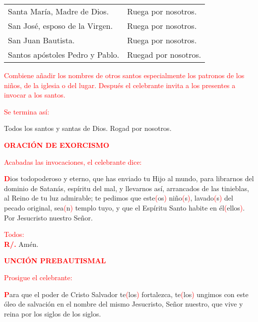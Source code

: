 \documentclass[12pt, letterpaper, spanish]{article}
\begin{document}
  \noindent
  \Large \begin{tabular}{ll}
  Santa Mar\'ia, Madre de Dios.& Ruega por nosotros. \\
  San Jos\'e, esposo de la Virgen.& Ruega por nosotros. \\
  San Juan Bautista.& Ruega por nosotros. \\
  Santos ap\'ostoles Pedro y Pablo.& Ruegad por nosotros.
  \end{tabular}

  \large {\textcolor{red}{Combiene a\~nadir los nombres de otros santos especialmente los patronos de los ni\~nos, de la iglesia o del lugar. Despu\'es el celebrante invita a los presentes a invocar a los santos.}} 

  \large {\textcolor{red}{Se termina as\'i:}} 

  \noindent
  \Large Todos los santos y santas de Dios. Rogad por nosotros. 

  \Large {\bfseries \textcolor{red}{ORACI\'ON DE EXORCISMO}} 

  \large {\textcolor{red}{Acabadas las invocaciones, el celebrante dice:}} 

  \lettrine[lines=2]{\bfseries \textcolor{red}{D}}{}\Large ios todopoderoso y eterno, que has enviado tu Hijo al mundo, para librarnos del dominio de Satan\'as, esp\'iritu del mal, y llevarnos as\'i, arrancados de las tinieblas, al Reino de tu luz admirable; te pedimos que este\textcolor{red}{(}os\textcolor{red}{)} ni\~no\textcolor{red}{(}s\textcolor{red}{)}, lavado\textcolor{red}{(}s\textcolor{red}{)} del pecado original, sea\textcolor{red}{(}n\textcolor{red}{)} templo tuyo, y que el Esp\'iritu Santo habite en \'el\textcolor{red}{(}ellos\textcolor{red}{)}. Por Jesucristo nuestro Se\~nor.

  \large {\textcolor{red}{Todos:}}\\
  \Large {\bfseries \textcolor{red}{R/.}} \hspace{0.5cm} Am\'en.

  \clearpage

  \Large {\bfseries \textcolor{red}{UNCI\'ON PREBAUTISMAL}} 

  \large {\textcolor{red}{Prosigue el celebrante:}}
  
  \lettrine[lines=2]{\bfseries \textcolor{red}{P}}{}\Large ara que el poder de Cristo Salvador te\textcolor{red}{(}los\textcolor{red}{)} fortalezca, te\textcolor{red}{(}los\textcolor{red}{)} ungimos con este \'oleo de salvaci\'on en el nombre del mismo Jesucristo, Se\~nor nuestro, que vive y reina por los siglos de los siglos.
\end{document}
